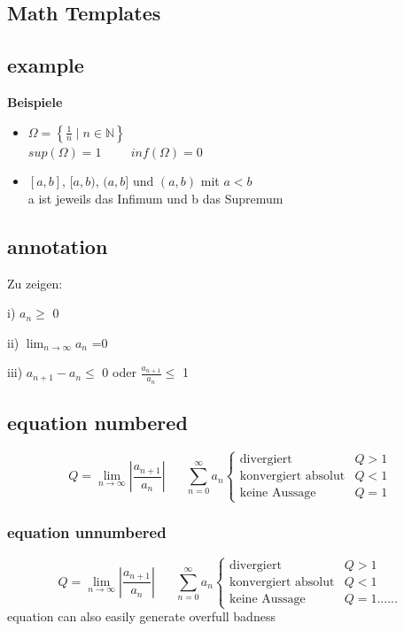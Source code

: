 \documentclass[a4paper,10pt,landscape]{scrartcl}
\begin{document}
\begin{multicols*}{3}
\section{Math Templates}
\subsection{example}
\begin{example}
    \textbf{Beispiele}
	\begin{itemize}
		\item $\Omega = \left\{\frac{1}{n}\mid n\in \mathbb{N}\right\}$\\[3pt]
		$sup(\Omega) = 1 \hspace{1cm} inf(\Omega) = 0$
		\item$[a, b]$, $[a, b)$, $(a, b]$ und $(a, b)$ mit $a<b$\\
	    a ist jeweils das Infimum und b das Supremum
	\end{itemize}
\end{example}
%
\subsection{annotation}
\begin{annotation}{Zu zeigen:}
	\item[i)] $a_n \ge$ 0
	\item[ii)] $\lim_{n\rightarrow \infty} a_n$ =0
	\item[iii)] $a_{n+1} - a_n \le$ 0 oder $\frac{a_{n+1}}{a_n} \le $ 1
\end{annotation}
%
\subsection{equation numbered}
\begin{equation}
Q=\lim_{n\rightarrow \infty} \left \vert\frac{a_{n+1}}{a_n}\right \vert \hspace{20pt} \sum_{n=0}^{\infty}a_n
	\begin{cases}
		\text{divergiert} \hspace{5pt} &Q>1\\
		\text{konvergiert absolut} &Q<1\\
		\text{keine Aussage} &Q=1
	\end{cases}
\end{equation}
%
\subsubsection{equation unnumbered}
\begin{equation*}
Q=\lim_{n\rightarrow \infty} \left \vert\frac{a_{n+1}}{a_n}\right \vert \hspace{20pt} \sum_{n=0}^{\infty}a_n
	\begin{cases}
		\text{divergiert} \hspace{5pt} &Q>1\\
		\text{konvergiert absolut} &Q<1\\
		\text{keine Aussage} &Q=1......
	\end{cases}
\end{equation*}
equation can also easily generate overfull badness
%
\vfill\null %
\columnbreak

\end{multicols*}
\end{document}

